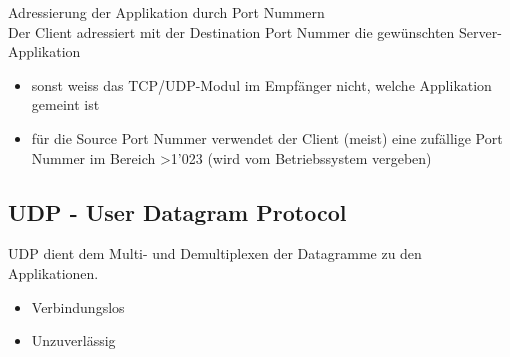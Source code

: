 \begin{concept}{Adressierung der Applikation durch Port Nummern}\\
    Der Client adressiert mit der Destination Port Nummer die gewünschten Server-Applikation
    \begin{itemize}
        \item sonst weiss das TCP/UDP-Modul im Empfänger nicht, welche Applikation gemeint ist
        \item für die Source Port Nummer verwendet der Client (meist) eine zufällige Port Nummer im Bereich >1'023 (wird vom Betriebssystem vergeben)
    \end{itemize}
\end{concept}
    
\columnbreak

\subsection{UDP - User Datagram Protocol}

\begin{definition}{UDP}
    dient dem Multi- und Demultiplexen der Datagramme zu den Applikationen.
    \begin{itemize}
        \item Verbindungslos
        \item Unzuverlässig
    \end{itemize}
\end{definition}

